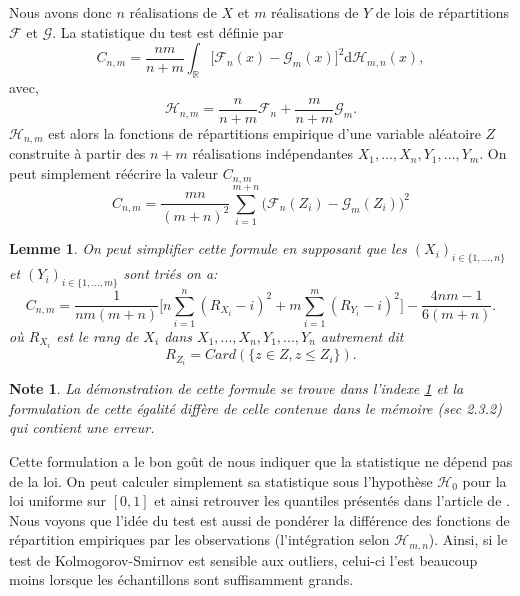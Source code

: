 \documentclass[a4paper,10pt]{article}
\newtheorem{lemma}{Lemme}
\newtheorem{note}{Note}
\begin{document}
Nous avons donc $n$ réalisations de $X$ et $m$ réalisations de $Y$ de lois de répartitions $\mathcal{F}$ et $\mathcal{G}$.
La statistique du test est définie par
\begin{equation}
	C_{n,m}=\frac{nm}{n+m}\int_{\mathbb{R}}\big[ \mathcal{F}_{n}(x)-\mathcal{G}_{m}(x)\big]^{2} \mathrm{d} \mathcal{H}_{m,n}(x),
\end{equation}
avec,
\begin{equation}
	\mathcal{H}_{n,m}=\frac{n}{n+m}\mathcal{F}_n+\frac{m}{n+m}\mathcal{G}_m.
\end{equation}
$\mathcal{H}_{n,m}$ est alors la fonctions de répartitions empirique d'une variable aléatoire $Z$ construite à partir des $n+m$ réalisations indépendantes $X_1,...,X_n,Y_1,...,Y_m$. On peut simplement réécrire la valeur $C_{n,m}$
\begin{equation}
	C_{n,m}=\frac{mn}{(m+n)^2}\sum_{i=1}^{m+n}\big(\mathcal{F}_n(Z_i)-\mathcal{G}_{m}(Z_i)\big)^2
\end{equation}

\begin{lemma}
	\label{C-v}
	On peut simplifier cette formule en supposant que les $(X_i)_{i\in \{1,...,n\}}$ et $(Y_i)_{i\in \{1,...,m\}}$ sont triés on a:
	\begin{equation}
		C_{n,m}=\frac{1}{nm(m+n)}\Big[ n\sum_{i=1}^{n}(R_{X_i}-i)^2+ m\sum_{i=1}^{m}(R_{Y_i}-i)^2\Big]-\frac{4nm-1}{6(m+n)}.
	\end{equation}
	où $R_{X_i}$ est le rang de $X_i$ dans $X_1,...,X_n,Y_1,...,Y_n$ autrement dit 
	\[R_{Z_i}=Card(\{z\in Z, z\leq Z_i\}).\] 
\end{lemma}

\begin{note}
	La démonstration de cette formule se trouve dans l'indexe \ref{C-v} et la formulation de cette égalité diffère de celle contenue dans le mémoire \cite{ethier2011propos}(sec 2.3.2) qui contient une erreur.
\end{note}
Cette formulation a le bon goût de nous indiquer que la statistique ne dépend pas de la loi. On peut calculer simplement sa statistique sous l'hypothèse $\mathcal{H}_0$ pour la loi uniforme sur $[0,1]$ et ainsi retrouver les quantiles présentés dans l'article de \cite{buning2002robustness}. Nous voyons que l'idée du test est aussi de pondérer la différence des fonctions de répartition empiriques par les observations (l'intégration selon $\mathcal{H}_{m,n}$). Ainsi, si le test de Kolmogorov-Smirnov est sensible aux outliers, celui-ci l’est beaucoup moins lorsque les échantillons sont suffisamment grands.
\end{document}
